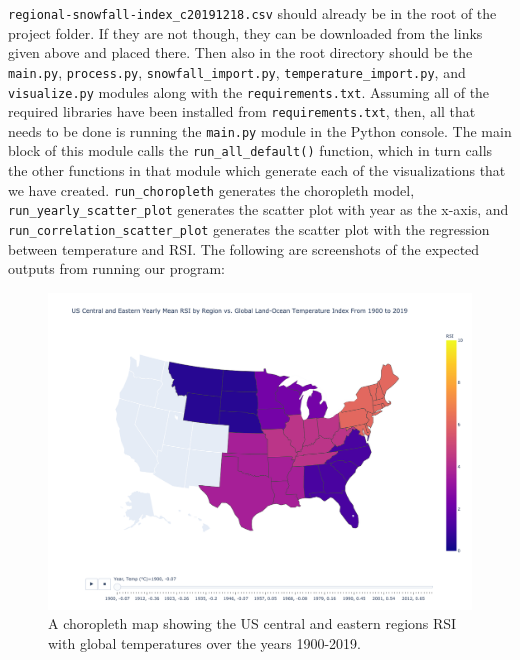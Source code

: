 \documentclass[fontsize=11pt]{article}
\begin{document}
\noindent \texttt{regional-snowfall-index\_c20191218.csv} should already be in the root of the project folder. If they are not though, they can be downloaded from the links given above and placed there. Then also in the root directory should be the \texttt{main.py}, \texttt{process.py}, \texttt{snowfall\_import.py}, \texttt{temperature\_import.py}, and \texttt{visualize.py} modules along with the \texttt{requirements.txt}. Assuming all of the required libraries have been installed from \texttt{requirements.txt}, then, all that needs to be done is running the \texttt{main.py} module in the Python console. The main block of this module calls the \texttt{run\_all\_default()} function, which in turn calls the other functions in that module which generate each of the visualizations that we have created. \texttt{run\_choropleth} generates the choropleth model, \texttt{run\_yearly\_scatter\_plot} generates the scatter plot with year as the x-axis, and \texttt{run\_correlation\_scatter\_plot} generates the scatter plot with the regression between temperature and RSI. 
The following are screenshots of the expected outputs from running our program:\\
\begin{figure}[h]
    \centering
    \includegraphics[scale=.35]{choropleth.png}
    \caption{A choropleth map showing the US central and eastern regions RSI with global temperatures over the years 1900-2019.}
    \label{fig:my_label}
\end{figure}

\newpage
\end{document}
